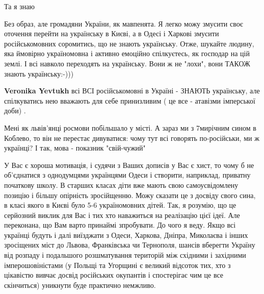 \begin{itemize}
\begin{itemize}
Та я знаю \Smiley[1.0][yellow]
\end{itemize}

 

Без образ, але громадяни України, як мавпенята. Я легко можу змусити своє
оточення перейти на українську в Києві, а в Одесі і Харкові змусити
російськомовних соромитись, що не знають українську. Отже, шукайте людину, яка
ймовірно україномовна і активно емоційно спілкуєтесь, як господар на цій землі.
І всі навколо переходять на українську. Вони ж не "лохи", вони ТАКОЖ знають
українську:-)))

\begin{itemize}
 
\textbf{Veronika Yevtukh} всі ВСІ російськомовні в Україні - ЗНАЮТЬ українську, але спілкуватись нею вважають для себе принизливим ( це все - атавізми імперської доби) .
\end{itemize}

 

Мені як львів'янці росмови побільшало у місті. А зараз ми з 7мирічним сином в
Коблево, то він не перестає дивуватися: чому тут всі говорять по-російськи, ми
ж українці? І так, мова - показник "свій-чужий"


 

У Вас є хороша мотивація, і судячи з Ваших дописів у Вас є хист, то чому б не
об'єднатися з однодумцями українцями Одеси і створити, наприклад, приватну
початкову школу. В старших класах діти вже мають свою самоусвідомлену позицію і
більшу опірність зросійщенню. Можу сказати це з досвіду свого сина, в класі
якого в Києві було 5-6 україномовних дітей. Так, я розумію, що це серйозний
виклик для Вас і тих хто наважиться на реалізацію цієї ідеї. Але переконана, що
Вам варто принаймі зпробувати. До чого я веду. Якщо всі українці будуть і далі
виїзджати з Одеси, Харкова, Дніпра, Миколаєва і інших зросіщених міст до
Львова, Франківська чи Тернополя, шансів вберегти Україну від розпаду і
подальшого розшматування територій між східними і західними імперошовіністами
(у Польщі та Угорщині є великий відсоток тих, хто з цікавістю вивчає досвід
російських окупантів і спостерігає чим це все скінчиться) уникнути буде
практично немжливо.


\end{itemize}
